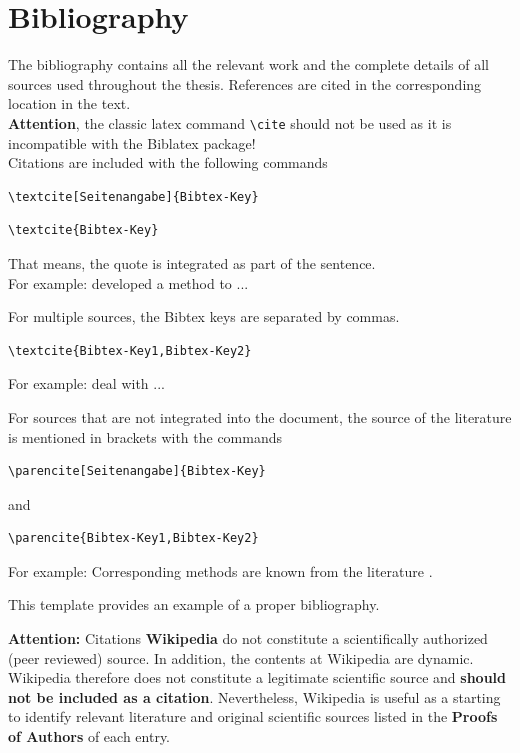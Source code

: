 \section{Bibliography}
\label{hinweise:literaturverzeichnis}

The bibliography contains all the relevant work and the complete details of all sources used throughout the thesis.
References are cited in the corresponding location in the text. \\

\textbf{Attention}, the classic latex command \texttt{\textbackslash cite} should not be used as it is incompatible with the Biblatex package! \\

Citations are included with the following commands
\begin{verbatim}\textcite[Seitenangabe]{Bibtex-Key}\end{verbatim}
\begin{verbatim}\textcite{Bibtex-Key}\end{verbatim}
That means, the quote is integrated as part of the sentence. \\
For example: \textcite[S. 123 ff.]{Book3} developed a method to ...

For multiple sources, the Bibtex keys are separated by commas.
\begin{verbatim}\textcite{Bibtex-Key1,Bibtex-Key2}\end{verbatim} 
For example: \textcite{Book3, InProc4} deal with ...

For sources that are not integrated into the document, the source of the literature is mentioned in brackets with the commands 
\begin{verbatim}\parencite[Seitenangabe]{Bibtex-Key}\end{verbatim} 
and 
\begin{verbatim}\parencite{Bibtex-Key1,Bibtex-Key2}\end{verbatim} 
For example: Corresponding methods are known from the literature \parencite{Book3,InProc4}.

This template provides an example of a proper bibliography.

\textbf{Attention:} Citations \textbf{Wikipedia} do not constitute a scientifically authorized (peer reviewed) source. In addition, the contents at Wikipedia are dynamic.
Wikipedia therefore does not constitute a legitimate scientific source and \textbf{should not be included as a citation}.
Nevertheless, Wikipedia  is useful as a starting to identify relevant literature and original scientific sources listed in the \textbf{Proofs of Authors} of each entry.

